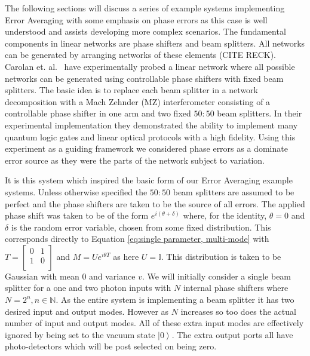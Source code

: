 \documentclass[aps,pra,twocolumn,superscriptaddress,numerical]{revtex4-1}
\begin{document}
	
The following sections will discuss a series of example systems implementing Error Averaging with some emphasis on phase errors as this case is well understood and assists developing more complex scenarios.  The fundamental components in linear networks are phase shifters and beam splitters.  All networks can be generated by arranging networks of these elements (CITE RECK). Carolan et. al.~\cite{ULO} have experimentally probed a linear network where all possible networks can be generated using controllable phase shifters with fixed beam splitters. The basic idea is to replace each beam splitter in a network decomposition with a Mach Zehnder (MZ) interferometer consisting of a controllable phase shifter in one arm and two fixed $50:50$ beam splitters. In their experimental implementation they demonstrated the ability to implement many quantum logic gates and linear optical protocols with a high fidelity.  Using this experiment as a guiding framework we considered phase errors as a dominate error source as they were the parts of the network subject to variation. 
	
It is this system which inspired the basic form of our Error Averaging example systems. Unless otherwise specified the $50:50$ beam splitters are assumed to be perfect and the phase shifters are taken to be the source of all errors. The applied phase shift was taken to be of the form $e^{i(\theta+\delta)}$ where, for the identity, $\theta=0$ and $\delta$ is the random error variable, chosen from some fixed distribution. This corresponds directly to Equation \ref{eq:single parameter, multi-mode} with $T=\begin{bmatrix}	0 & 1 \\	1 & 0 \\\end{bmatrix}$ and $M=Ue^{i\theta T}$ as here $U=\mathbb{I}$. This distribution is taken to be Gaussian with mean $0$ and variance $v$. We will initially consider a single beam splitter for a one and two photon inputs with $N$ internal phase shifters where $N=2^{n},n\in\mathbb{N}$. As the entire system is implementing a beam splitter it has two desired input and output modes. However as $N$ increases so too does the actual number of input and output modes. All of these extra input modes are effectively ignored by being set to the vacuum state $\left|0\right\rangle $. The extra output ports all have photo-detectors which will be post selected on being zero.
		
\end{document}

